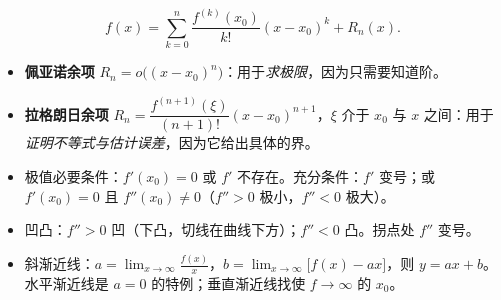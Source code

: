 
\[
f(x)=\sum_{k=0}^{n}\frac{f^{(k)}(x_0)}{k!}(x-x_0)^k+R_n(x).
\]

\begin{itemize}[leftmargin=1.6em,itemsep=1pt]
\item \textbf{佩亚诺余项} $R_n=o\bigl((x-x_0)^n\bigr)$：用于\emph{求极限}，因为只需要知道阶。
\item \textbf{拉格朗日余项} $R_n=\dfrac{f^{(n+1)}(\xi)}{(n+1)!}(x-x_0)^{n+1}$，$\xi$ 介于 $x_0$ 与 $x$ 之间：用于\emph{证明不等式与估计误差}，因为它给出具体的界。
\end{itemize}


\begin{itemize}[leftmargin=1.6em,itemsep=1pt]
\item 极值必要条件：$f'(x_0)=0$ 或 $f'$ 不存在。充分条件：$f'$ 变号；或 $f'(x_0)=0$ 且 $f''(x_0)\ne0$（$f''>0$ 极小，$f''<0$ 极大）。
\item 凹凸：$f''>0$ 凹（下凸，切线在曲线下方）；$f''<0$ 凸。拐点处 $f''$ 变号。
\item 斜渐近线：$a=\lim_{x\to\infty}\frac{f(x)}{x}$，$b=\lim_{x\to\infty}\bigl[f(x)-ax\bigr]$，则 $y=ax+b$。水平渐近线是 $a=0$ 的特例；垂直渐近线找使 $f\to\infty$ 的 $x_0$。
\end{itemize}

